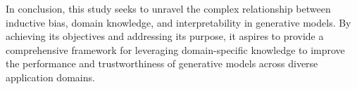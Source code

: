 In conclusion, this study seeks to unravel the complex relationship between inductive bias, domain knowledge, and interpretability in generative models. By achieving its objectives and addressing its purpose, it aspires to provide a comprehensive framework for leveraging domain-specific knowledge to improve the performance and trustworthiness of generative models across diverse application domains.
